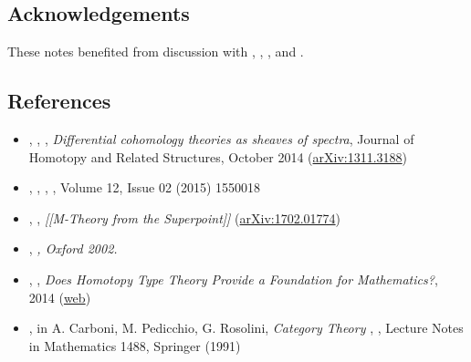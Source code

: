 \documentclass[12pt,titlepage]{article}
\theoremstyle{plain}
\theoremstyle{definition}
\theoremstyle{remark}
\begin{document}
\hypertarget{acknowledgements}{}\subsection*{{Acknowledgements}}\label{acknowledgements}

These notes benefited from discussion with , , ,  and .

\hypertarget{references}{}\subsection*{{References}}\label{references}

\begin{itemize}%
\item {}, , , \emph{Differential cohomology theories as sheaves of spectra}, Journal of Homotopy and Related Structures, October 2014 (\href{http://arxiv.org/abs/1311.3188}{arXiv:1311.3188})


\item {}, , , \emph{}, Volume 12, Issue 02 (2015) 1550018


\item {}, , \emph{[[M-Theory from the Superpoint]]} (\href{https://arxiv.org/abs/1702.01774}{arXiv:1702.01774})


\item {}, \emph{, Oxford 2002.}


\item {}, , \emph{Does Homotopy Type Theory Provide a Foundation for Mathematics?}, 2014 (\href{http://philsci-archive.pitt.edu/11143/}{web})


\item {}, \emph{} in A. Carboni, M. Pedicchio, G. Rosolini, \emph{Category Theory} , , Lecture Notes in Mathematics 1488, Springer (1991)



\end{itemize}
\end{document}
